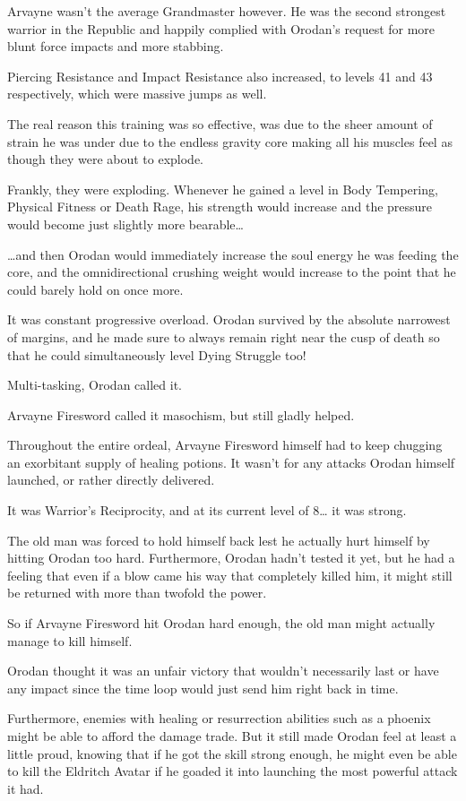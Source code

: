 \documentclass[a4paper,10pt]{book}
\begin{document}
Arvayne wasn’t the average Grandmaster however. He was the second strongest warrior in the Republic and happily complied with Orodan’s request for more blunt force impacts and more stabbing.\par
Piercing Resistance and Impact Resistance also increased, to levels 41 and 43 respectively, which were massive jumps as well.\par
The real reason this training was so effective, was due to the sheer amount of strain he was under due to the endless gravity core making all his muscles feel as though they were about to explode.\par
Frankly, they were exploding. Whenever he gained a level in Body Tempering, Physical Fitness or Death Rage, his strength would increase and the pressure would become just slightly more bearable…\par
…and then Orodan would immediately increase the soul energy he was feeding the core, and the omnidirectional crushing weight would increase to the point that he could barely hold on once more.\par
It was constant progressive overload. Orodan survived by the absolute narrowest of margins, and he made sure to always remain right near the cusp of death so that he could simultaneously level Dying Struggle too!\par
Multi-tasking, Orodan called it.\par
Arvayne Firesword called it masochism, but still gladly helped.\par
Throughout the entire ordeal, Arvayne Firesword himself had to keep chugging an exorbitant supply of healing potions. It wasn’t for any attacks Orodan himself launched, or rather directly delivered.\par
It was Warrior’s Reciprocity, and at its current level of 8… it was strong.\par
The old man was forced to hold himself back lest he actually hurt himself by hitting Orodan too hard. Furthermore, Orodan hadn’t tested it yet, but he had a feeling that even if a blow came his way that completely killed him, it might still be returned with more than twofold the power.\par
So if Arvayne Firesword hit Orodan hard enough, the old man might actually manage to kill himself.\par
Orodan thought it was an unfair victory that wouldn’t necessarily last or have any impact since the time loop would just send him right back in time.\par
Furthermore, enemies with healing or resurrection abilities such as a phoenix might be able to afford the damage trade. But it still made Orodan feel at least a little proud, knowing that if he got the skill strong enough, he might even be able to kill the Eldritch Avatar if he goaded it into launching the most powerful attack it had.\par
\end{document}
